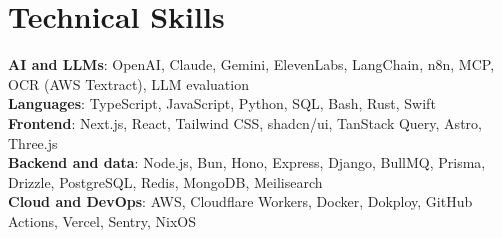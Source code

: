 \section{Technical Skills}
\begin{itemize}[leftmargin=0.15in, label={}, itemsep=0pt]
  \small{\item{
    \textbf{AI and LLMs}{: OpenAI, Claude, Gemini, ElevenLabs, LangChain, n8n, MCP, OCR (AWS Textract), LLM evaluation} \\
    \textbf{Languages}{: TypeScript, JavaScript, Python, SQL, Bash, Rust, Swift} \\
    \textbf{Frontend}{: Next.js, React, Tailwind CSS, shadcn/ui, TanStack Query, Astro, Three.js} \\
    \textbf{Backend and data}{: Node.js, Bun, Hono, Express, Django, BullMQ, Prisma, Drizzle, PostgreSQL, Redis, MongoDB, Meilisearch} \\
    \textbf{Cloud and DevOps}{: AWS, Cloudflare Workers, Docker, Dokploy, GitHub Actions, Vercel, Sentry, NixOS}
  }}
\end{itemize}

\cvachievements

